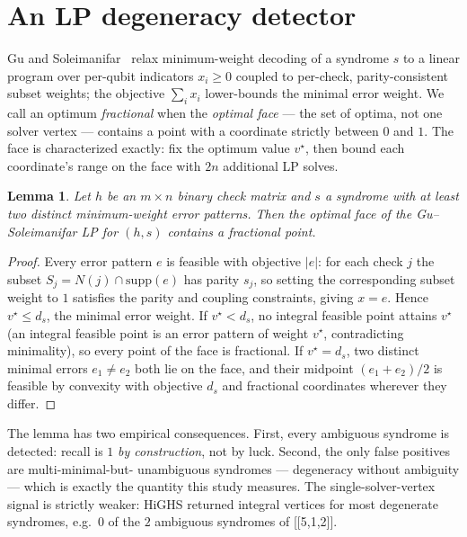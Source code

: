 \documentclass[10pt]{article}
\newtheorem{lemma}{Lemma}
\begin{document}
\section{An LP degeneracy detector}

Gu and Soleimanifar~\cite{gusoleimanifar} relax minimum-weight decoding
of a syndrome $s$ to a linear program over per-qubit indicators $x_i
\ge 0$ coupled to per-check, parity-consistent subset weights; the
objective $\sum_i x_i$ lower-bounds the minimal error weight. We call
an optimum \emph{fractional} when the \emph{optimal face} --- the set of
optima, not one solver vertex --- contains a point with a coordinate
strictly between $0$ and $1$. The face is characterized exactly: fix
the optimum value $v^\star$, then bound each coordinate's range on the
face with $2n$ additional LP solves.

\begin{lemma}
\label{lem:fractional}
Let $h$ be an $m \times n$ binary check matrix and $s$ a syndrome with
at least two distinct minimum-weight error patterns. Then the optimal
face of the Gu--Soleimanifar LP for $(h, s)$ contains a fractional
point.
\end{lemma}

\begin{proof}
Every error pattern $e$ is feasible with objective $\lvert e\rvert$:
for each check $j$ the subset $S_j = N(j) \cap \mathrm{supp}(e)$ has
parity $s_j$, so setting the corresponding subset weight to $1$
satisfies the parity and coupling constraints, giving $x = e$. Hence
$v^\star \le d_s$, the minimal error weight. If $v^\star < d_s$, no
integral feasible point attains $v^\star$ (an integral feasible point
is an error pattern of weight $v^\star$, contradicting minimality), so
every point of the face is fractional. If $v^\star = d_s$, two distinct
minimal errors $e_1 \neq e_2$ both lie on the face, and their midpoint
$(e_1 + e_2)/2$ is feasible by convexity with objective $d_s$ and
fractional coordinates wherever they differ.
\end{proof}

The lemma has two empirical consequences. First, every ambiguous
syndrome is detected: recall is $1$ \emph{by construction}, not by
luck. Second, the only false positives are multi-minimal-but-
unambiguous syndromes --- degeneracy without ambiguity --- which is
exactly the quantity this study measures. The single-solver-vertex
signal is strictly weaker: HiGHS returned integral vertices for most
degenerate syndromes, e.g.\ $0$ of the $2$ ambiguous syndromes of
[[5,1,2]].
\end{document}
